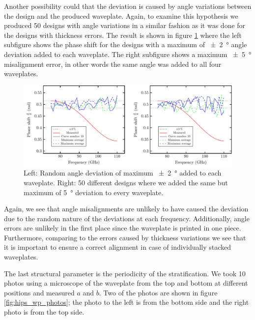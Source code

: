 Another possibility could that the deviation is caused by angle variations between the design and the produced waveplate. Again, to examine this hypothesis we produced 50 designs with angle variations in a similar fashion as it was done for the designs with thickness errors. The result is shown in figure \ref{fig:delta_angle_err} where the left subfigure shows the phase shift for the designs with a maximum of \SI{\pm2}{\degree} angle deviation added to each waveplate. The right subfigure shows a maximum \SI{\pm5}{\degree} misalignment error, in other words the same angle was added to all four waveplates. 

\begin{figure}[H]
    \centering
    \includegraphics[scale=0.7]{images/results/plots/polymer/dimension_errors/delta_angle_error.pdf}
    \caption{Left: Random angle deviation of maximum \SI{\pm2}{\degree} added to each waveplate. Right: 50 different designs where we added the same but maximum of \SI{5}{\degree} deviation to every waveplate.}
    \label{fig:delta_angle_err}
\end{figure}

Again, we see that angle misalignments are unlikely to have caused the deviation due to the random nature of the deviations at each frequency. Additionally, angle errors are unlikely in the first place since the waveplate is printed in one piece. Furthermore, comparing to the errors caused by thickness variations we see that it is important to ensure a correct alignment in case of individually stacked waveplates. 

The last structural parameter is the periodicity of the stratification. We took 10 photos using a microscope of the waveplate from the top and bottom at different positions and measured $a$ and $b$. Two of the photos are shown in figure \ref{fig:hips_wp_photos}; the photo to
the left is from the bottom side and the right photo is from the top side.

